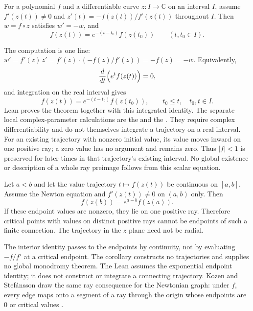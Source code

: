 \documentclass[11pt]{article}
\begin{document}
\begin{theorem}\label{res:value}
For a polynomial $f$ and a differentiable curve $z:I\to\mathbb C$ on an
interval $I$, assume $f'(z(t))\ne0$ and
$z'(t)=-f(z(t))/f'(z(t))$ throughout $I$.  Then $w=f\circ z$ satisfies
$w'=-w$, and
\[
 f(z(t))=e^{-(t-t_0)}f(z(t_0))\qquad(t,t_0\in I).
\]
\end{theorem}

\noindent The computation is one line: $w'=f'(z)\,z'=f'(z)\cdot(-f(z)/f'(z))=-f(z)=-w$.
Equivalently,
\[
  \frac{d}{dt}\Bigl(e^{t}f(z(t))\Bigr)=0,
\]
and integration on the real interval gives
\[
  f(z(t))=e^{-(t-t_0)}f(z(t_0)),\qquad t_0\le t,\quad t_0,t\in I .
\]
Lean proves the theorem together with this integrated identity.
The separate local complex-parameter calculations are the
and the
.
They require complex differentiability and do not themselves integrate a
trajectory on a real interval.
For an existing trajectory with nonzero initial value, its value moves
inward on one positive ray; a zero value has no argument and remains zero.
Thus $|f|<1$ is preserved for later times in that trajectory's existing
interval. No global existence or description of a whole ray preimage follows
from this scalar equation.

\begin{corollary}\label{res:ray}
Let $a<b$ and let the value trajectory $t\mapsto f(z(t))$ be continuous on
$[a,b]$. Assume the Newton equation and $f'(z(t))\ne0$ on $(a,b)$ only.
Then
\[
 f(z(b))=e^{a-b}f(z(a)).
\]
If these endpoint values are nonzero, they lie on one positive ray. Therefore
critical points with values on distinct positive rays cannot be endpoints
of such a finite connection. The trajectory in the $z$ plane need not be radial.
\end{corollary}

\noindent The interior identity passes to the endpoints by continuity, not
by evaluating $-f/f'$ at a critical endpoint. The corollary constructs no
trajectories and supplies no global monodromy theorem.
The Lean 
assumes the exponential endpoint identity; it does not construct or
integrate a connecting trajectory.
Kozen and Stef\'ansson draw the same ray consequence for the Newtonian graph:
under $f$, every edge maps onto a segment of a ray through the origin whose
endpoints are $0$ or critical values \cite[\S2]{kozen-stefansson1997}.
\end{document}
